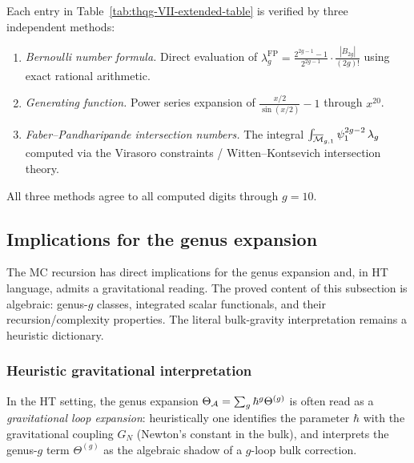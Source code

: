 \begin{remark}
\label{rem:thqg-VII-verification}
Each entry in Table~\ref{tab:thqg-VII-extended-table} is verified
by three independent methods:
\begin{enumerate}[label=\textup{(\roman*)}]
\item \emph{Bernoulli number formula.}
 Direct evaluation of
 $\lambda_g^{\mathrm{FP}} =
 \frac{2^{2g-1}-1}{2^{2g-1}} \cdot \frac{|B_{2g}|}{(2g)!}$
 using exact rational arithmetic.
\item \emph{Generating function.}
 Power series expansion of
 $\frac{x/2}{\sin(x/2)} - 1$ through $x^{20}$.
\item \emph{Faber--Pandharipande intersection numbers.}
 The integral
 $\int_{\overline{\mathcal{M}}_{g,1}} \psi_1^{2g-2}\, \lambda_g$
 computed via the Virasoro constraints / Witten--Kontsevich
 intersection theory.
\end{enumerate}
All three methods agree to all computed digits through $g = 10$.
\end{remark}

%
%

\subsection{Implications for the genus expansion}
\label{subsec:thqg-VII-gravity-loops}

The MC recursion has direct implications for the genus expansion and,
in HT language, admits a gravitational reading. The proved content of
this subsection is algebraic: genus-$g$ classes, integrated scalar
functionals, and their recursion/complexity properties. The literal
bulk-gravity interpretation remains a heuristic dictionary.

\subsubsection{Heuristic gravitational interpretation}
\label{subsubsec:thqg-VII-grav-interpretation}

In the HT setting, the genus expansion
$\Theta_{\mathcal{A}} = \sum_g \hbar^g \Theta^{(g)}$ is often read as a
\emph{gravitational loop expansion}: heuristically one identifies the
parameter $\hbar$ with the gravitational coupling $G_N$
\textup{(}Newton's constant in the bulk\textup{)}, and interprets the
genus-$g$ term $\Theta^{(g)}$ as the algebraic shadow of a $g$-loop
bulk correction.

